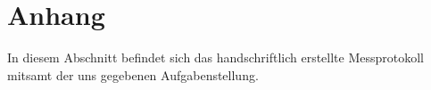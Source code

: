 \section{Anhang}
In diesem Abschnitt befindet sich das handschriftlich erstellte Messprotokoll mitsamt der uns gegebenen Aufgabenstellung.\\
\begin{figure}[htbp]

\end{figure}

